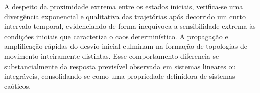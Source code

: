 \documentclass[12pt,a4paper]{article}
\begin{document}
    A despeito da proximidade extrema entre os estados iniciais, verifica-se uma divergência exponencial e qualitativa das trajetórias após decorrido um curto intervalo temporal, evidenciando de forma inequívoca a sensibilidade extrema às condições iniciais que caracteriza o caos determinístico. A propagação e amplificação rápidas do desvio inicial culminam na formação de topologias de movimento inteiramente distintas. Esse comportamento diferencia-se substancialmente da resposta previsível observada em sistemas lineares ou integráveis, consolidando-se como uma propriedade definidora de sistemas caóticos.
\end{document}
